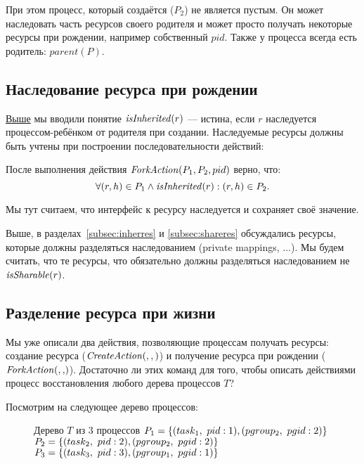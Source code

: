 При этом процесс, который создаётся ($P_2$) не является пустым. Он может наследовать часть ресурсов своего родителя и может просто получать некоторые ресурсы при рождении, например собственный $pid$. Также у процесса всегда есть родитель: $parent(P)$.

\subsection{Наследование ресурса при рождении}

\hyperref[def:isinherited]{Выше} мы вводили понятие $\text{\textit{isInherited}}(r)$ --- истина, если $r$ наследуется процессом-ребёнком от родителя при создании. Наследуемые ресурсы должны быть учтены при построении последовательности действий:

После выполнения действия $\text{\textit{ForkAction}}(P_1, P_2, pid)$ верно, что:
\begin{equation}
\label{eq:inherAtFork} 
	\forall (r, h) \in P_1 \land \text{\textit{isInherited}}(r): (r, h) \in P_2.
\end{equation}

\begin{note}
Мы тут считаем, что интерфейс к ресурсу наследуется и сохраняет своё значение.
\end{note}

Выше, в разделах~\ref{subsec:inherres} и \ref{subsec:shareres} обсуждались ресурсы, которые должны разделяться наследованием (private mappings, ...). Мы будем считать, что те ресурсы, что обязательно должны разделяться наследованием не $\text{\textit{isSharable}}(r)$.

\subsection{Разделение ресурса при жизни}

Мы уже описали два действия, позволяющие процессам получать ресурсы: создание ресурса ($\text{\textit{CreateAction}}(, , )$) и получение ресурса при рождении ($\crfork{}{}$). Достаточно ли этих команд для того, чтобы описать действиями процесс восстановления любого дерева процессов $T$?

Посмотрим на следующее дерево процессов:

\begin{figure}[ht!]
\centering
{}
\begin{caption}{Дерево $T$ из 3 процессов}
$P_1 = \xbrace{(task_1,\ pid: 1), (pgroup_2,\ pgid: 2)}$\\
$P_2 = \xbrace{(task_2,\ pid: 2), (pgroup_2,\ pgid: 2)}$\\
$P_3 = \xbrace{(task_3,\ pid: 3), (pgroup_1,\ pgid: 1)}$
\end{caption}
\end{figure}

